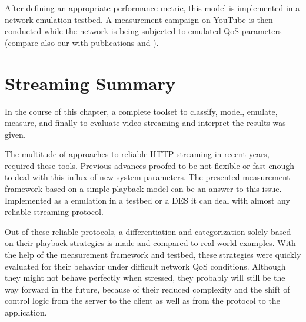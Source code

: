 After defining an appropriate performance metric, this model is implemented in a network emulation testbed. A measurement campaign on YouTube is then conducted while the network is being subjected to emulated \gls{QoS} parameters (compare also our with publications \cite{metzger2011delivery} and \cite{6229739}).















\section{Streaming Summary}
\label{c3:sec:conclusion}

In the course of this chapter, a complete toolset to classify, model, emulate, measure, and finally to evaluate video streaming and interpret the results was given.

The multitude of approaches to reliable \gls{HTTP} streaming in recent years, required these tools. Previous advances proofed to be not flexible or fast enough to deal with this influx of new system parameters. The presented measurement framework based on a simple playback model can be an answer to this issue. Implemented as a emulation in a testbed or a \gls{DES} it can deal with almost any reliable streaming protocol.

Out of these reliable protocols, a differentiation and categorization solely based on their playback strategies is made and compared to real world examples. With the help of the measurement framework and testbed, these strategies were quickly evaluated for their behavior under difficult network \gls{QoS} conditions. Although they might not behave perfectly when stressed, they probably will still be the way forward in the future, because of their reduced complexity and the shift of control logic from the server to the client as well as from the protocol to the application.

